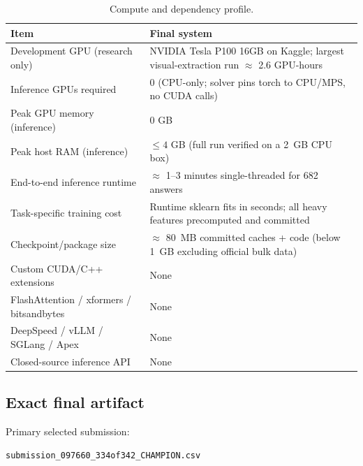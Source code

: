 \documentclass[12pt,a4paper]{article}
\begin{document}
\begin{table}[ht]
\centering
\small
\begin{tabularx}{\textwidth}{p{5.3cm}X}
\toprule
\textbf{Item} & \textbf{Final system} \\
\midrule

Development GPU (research only) &
NVIDIA Tesla P100 16GB on Kaggle; largest visual-extraction run $\approx$ 2.6 GPU-hours \\

Inference GPUs required &
0 (CPU-only; solver pins torch to CPU/MPS, no CUDA calls) \\

Peak GPU memory (inference) &
0 GB \\

Peak host RAM (inference) &
\(\leq 4\) GB (full run verified on a 2~GB CPU box) \\

End-to-end inference runtime &
\(\approx\) 1--3 minutes single-threaded for 682 answers \\

Task-specific training cost &
Runtime sklearn fits in seconds; all heavy features precomputed and committed \\

Checkpoint/package size &
\(\approx\) 80~MB committed caches + code (below 1~GB excluding official bulk data) \\

Custom CUDA/C++ extensions &
None \\

FlashAttention / xformers / bitsandbytes &
None \\

DeepSpeed / vLLM / SGLang / Apex &
None \\

Closed-source inference API &
None \\

\bottomrule
\end{tabularx}
\caption{Compute and dependency profile.}
\end{table}

\subsection{Exact final artifact}

Primary selected submission:

\begin{verbatim}
submission_097660_334of342_CHAMPION.csv
\end{verbatim}
\end{document}
